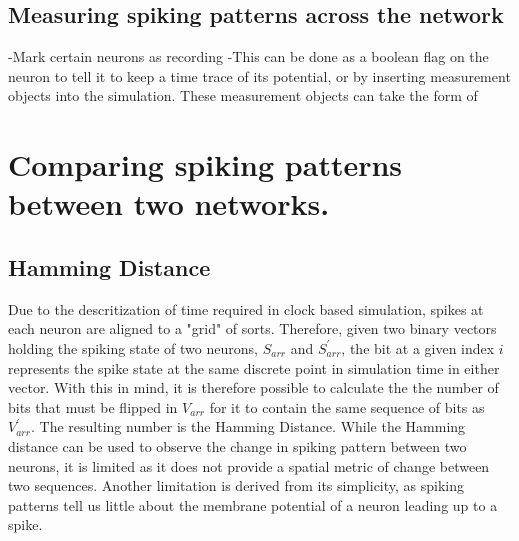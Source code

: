 \subsection{Measuring spiking patterns across the network}

-Mark certain neurons as recording
-This can be done as a boolean flag on the neuron to tell it to keep a time
trace of its potential, or by inserting measurement objects into the simulation.
These measurement objects can take the form of 

\section{Comparing spiking patterns between two networks.}

\subsection{Hamming Distance}
Due to the descritization of time required in clock based simulation, spikes at
each neuron are aligned to a "grid" of sorts. Therefore, given two binary
vectors holding the spiking state of two neurons, $S_{arr}$ and $S^\prime_{arr}$, the bit at a given index $i$ represents
the spike state at the same discrete point in simulation time in either vector.
With this in mind, it is therefore possible to calculate the the number of bits
that must be flipped in $V_{arr}$ for it to contain the same sequence of bits as
$V^\prime_{arr}$. The resulting number is the Hamming Distance. While the
Hamming distance can be used to observe the change in spiking pattern between
two neurons, it is limited as it does not provide a spatial metric of change
between two sequences. Another limitation is derived from its simplicity, as
spiking patterns tell us little about the membrane potential of a neuron leading
up to a spike.

